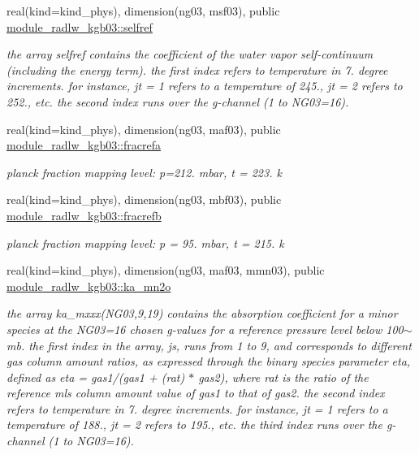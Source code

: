\begin{DoxyCompactItemize}
real(kind=kind\+\_\+phys), dimension(ng03, msf03), public \hyperlink{group__module__radlw__kgbnn_ga6bb40d898660e6dfc056d3efe1d0c544}{module\+\_\+radlw\+\_\+kgb03\+::selfref}
\begin{DoxyCompactList}\small\item\em the array selfref contains the coefficient of the water vapor self-\/continuum (including the energy term). the first index refers to temperature in 7. degree increments. for instance, jt = 1 refers to a temperature of 245., jt = 2 refers to 252., etc. the second index runs over the g-\/channel (1 to N\+G03=16). \end{DoxyCompactList}\item 
real(kind=kind\+\_\+phys), dimension(ng03, maf03), public \hyperlink{group__module__radlw__kgbnn_ga26e901a002e789933c5c9b622f3a0932}{module\+\_\+radlw\+\_\+kgb03\+::fracrefa}
\begin{DoxyCompactList}\small\item\em planck fraction mapping level\+: p=212. mbar, t = 223. k \end{DoxyCompactList}\item 
real(kind=kind\+\_\+phys), dimension(ng03, mbf03), public \hyperlink{group__module__radlw__kgbnn_gaf1d33a7362e73bf40ef592bc9863b612}{module\+\_\+radlw\+\_\+kgb03\+::fracrefb}
\begin{DoxyCompactList}\small\item\em planck fraction mapping level\+: p = 95. mbar, t = 215. k \end{DoxyCompactList}\item 
real(kind=kind\+\_\+phys), dimension(ng03, maf03, mmn03), public \hyperlink{group__module__radlw__kgbnn_gaeeba4e0a8fc97c557e1127b4d5d1bd94}{module\+\_\+radlw\+\_\+kgb03\+::ka\+\_\+mn2o}
\begin{DoxyCompactList}\small\item\em the array ka\+\_\+mxxx(\+N\+G03,9,19) contains the absorption coefficient for a minor species at the N\+G03=16 chosen g-\/values for a reference pressure level below 100$\sim$ mb. the first index in the array, js, runs from 1 to 9, and corresponds to different gas column amount ratios, as expressed through the binary species parameter eta, defined as eta = gas1/(gas1 + (rat) $\ast$ gas2), where rat is the ratio of the reference mls column amount value of gas1 to that of gas2. the second index refers to temperature in 7. degree increments. for instance, jt = 1 refers to a temperature of 188., jt = 2 refers to 195., etc. the third index runs over the g-\/channel (1 to N\+G03=16). \end{DoxyCompactList}\item 

\end{DoxyCompactItemize}
